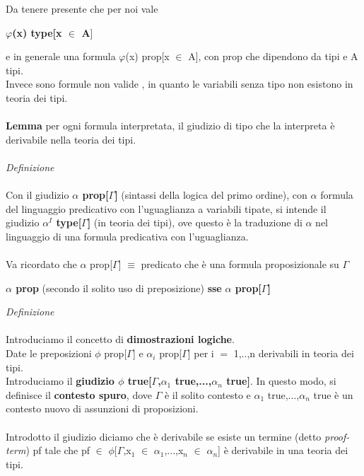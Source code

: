\noindent
Da tenere presente che per noi vale
\begin{center}\textbf{$\varphi$(x) type[x $\in$ A}]\end{center}
e in generale una formula $\varphi$(x) prop[x $\in$ A], con prop che dipendono da tipi e A tipi.\\
Invece sono formule non valide
 , 
in quanto le variabili senza tipo non esistono in teoria dei tipi.\\\\
\noindent
\textbf{Lemma} per ogni formula interpretata, il giudizio di tipo che la interpreta \`e derivabile nella teoria dei tipi.\\\\
\noindent
\textit{Definizione}\\\\
\noindent
Con il giudizio \textbf{$\alpha$ prop[$\Gamma$]} (sintassi della logica del primo ordine), con $\alpha$ formula del linguaggio predicativo con l'uguaglianza a variabili tipate,
si intende il giudizio \textbf{$\alpha^I$ type[$\Gamma$]} (in teoria dei tipi), ove questo \`e la traduzione di $\alpha$ nel linguaggio di una formula predicativa con l'uguaglianza.\\\\
\noindent
Va ricordato che $\alpha$ prop[$\Gamma$] $\equiv$ predicato che \`e una formula proposizionale su $\Gamma$
\begin{center}
\textbf{$\alpha$ prop} (secondo il solito uso di preposizione) \quad \textbf{sse} \quad \textbf{$\alpha$ prop[$\Gamma$]}
\end{center}
\vspace{0.3cm}
\textit{Definizione}\\\\
\noindent
Introduciamo il concetto di \textbf{dimostrazioni logiche}.\\
Date le preposizioni $\phi$ prop[$\Gamma$] e $\alpha_i$ prop[$\Gamma$] per i $=$ 1,..,n derivabili in teoria dei tipi.\\
Introduciamo il \textbf{giudizio $\phi$ true[$\Gamma$,$\alpha_1$ true,...,$\alpha_n$ true]}. In questo modo, si definisce il \textbf{contesto spuro}, dove $\Gamma$ \`e il solito contesto e $\alpha_1$ true,...,$\alpha_n$ true \`e un contesto nuovo di assunzioni di proposizioni.\\\\
\noindent
Introdotto il giudizio diciamo che \`e derivabile se esiste un termine (detto \textit{proof-term}) pf tale che pf $\in$ $\phi$[$\Gamma$,x$_1$ $\in$ $\alpha_1$,...,x$_n$ $\in$ $\alpha_n$] \`e derivabile in una teoria dei tipi.\\\\
